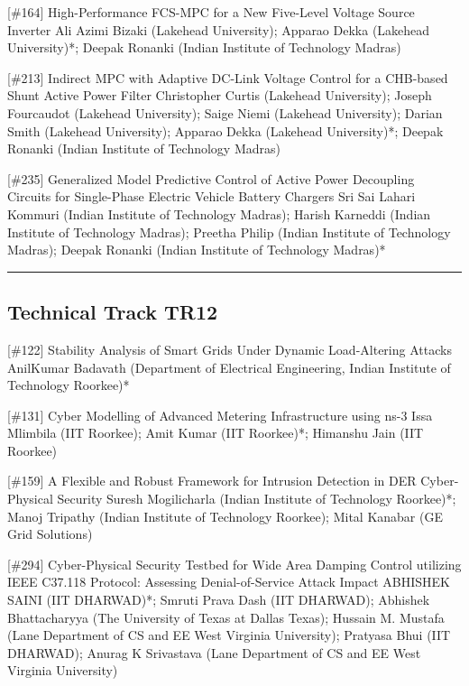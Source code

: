 {} \begin{abstract_online} {[\#164] High-Performance FCS-MPC for a New Five-Level Voltage Source Inverter} {} {Ali Azimi Bizaki (Lakehead University); Apparao Dekka (Lakehead University)*; Deepak Ronanki (Indian Institute of Technology Madras)} {}  \end{abstract_online} 
{} \begin{abstract_online} {[\#213] Indirect MPC with Adaptive DC-Link Voltage Control for a CHB-based Shunt Active Power Filter} {} {Christopher Curtis (Lakehead University); Joseph Fourcaudot (Lakehead University); Saige Niemi (Lakehead University); Darian Smith (Lakehead University); Apparao Dekka (Lakehead University)*; Deepak Ronanki (Indian Institute of Technology Madras)} {}  \end{abstract_online} 
{} \begin{abstract_online} {[\#235] Generalized Model Predictive Control of Active Power Decoupling Circuits for Single-Phase Electric Vehicle Battery Chargers} {} {Sri Sai Lahari Kommuri  (Indian Institute of Technology Madras); Harish Karneddi (Indian Institute of Technology Madras); Preetha Philip (Indian Institute of Technology Madras); Deepak  Ronanki (Indian Institute of Technology Madras)*} {}  \end{abstract_online} 
\hrule  \subsection{Technical Track TR12}\nopagebreak {} \begin{abstract_online} {[\#122] Stability Analysis of Smart Grids Under Dynamic Load-Altering Attacks} {} {AnilKumar Badavath (Department of Electrical Engineering, Indian Institute of Technology Roorkee)*} {}  \end{abstract_online} 
{} \begin{abstract_online} {[\#131] Cyber Modelling of Advanced Metering Infrastructure using  ns-3} {} {Issa Mlimbila (IIT Roorkee); Amit Kumar (IIT Roorkee)*;  Himanshu  Jain (IIT Roorkee)} {}  \end{abstract_online} 
{} \begin{abstract_online} {[\#159] A Flexible and Robust Framework for Intrusion Detection in DER Cyber-Physical Security} {} {Suresh Mogilicharla (Indian Institute of Technology Roorkee)*; Manoj Tripathy (Indian Institute of Technology Roorkee); Mital Kanabar (GE Grid Solutions)} {}  \end{abstract_online} 
{} \begin{abstract_online} {[\#294] Cyber-Physical Security Testbed for Wide Area Damping Control utilizing IEEE C37.118 Protocol: Assessing Denial-of-Service Attack Impact} {} {ABHISHEK SAINI (IIT DHARWAD)*; Smruti Prava  Dash (IIT DHARWAD); Abhishek  Bhattacharyya (The University of Texas at Dallas Texas); Hussain  M. Mustafa (Lane Department of CS and EE West Virginia University); Pratyasa  Bhui (IIT DHARWAD); Anurag  K Srivastava (Lane Department of CS and EE West Virginia University)} {}  \end{abstract_online} 
